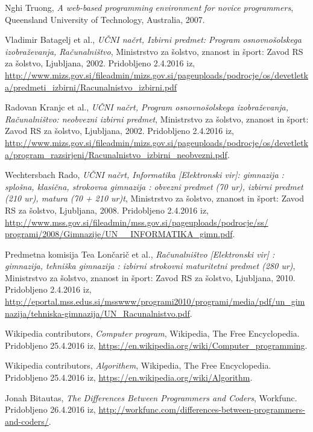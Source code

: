 \begin{thebibliography}{9}
  Nghi Truong,
  \emph{A web-based programming environment for novice programmers},
  Queensland University of Technology, Australia, 2007.

 Vladimir Batagelj et al., \emph{UČNI
    načrt, Izbirni predmet: Program osnovnošolskega izobraževanja,
    Računalništvo}, Ministrstvo za šolstvo, znanost in šport: Zavod RS
  za šolstvo, Ljubljana, 2002. Pridobljeno 2.4.2016 iz,
  \url{http://www.mizs.gov.si/fileadmin/mizs.gov.si/pageuploads/podrocje/os/devetletka/predmeti_izbirni/Racunalnistvo_izbirni.pdf}


 Radovan Kranjc et al., \emph{UČNI
    načrt, Program osnovnošolskega izobraževanja, Računalništvo:
    neobvezni izbirni predmet}, Ministrstvo za šolstvo, znanost in
  šport: Zavod RS za šolstvo, Ljubljana, 2002. Pridobljeno 2.4.2016
  iz,
  \url{http://www.mizs.gov.si/fileadmin/mizs.gov.si/pageuploads/podrocje/os/devetletka/program_razsirjeni/Racunalnistvo_izbirni_neobvezni.pdf}.

 Wechtersbach Rado, \emph{UČNI
    načrt, Informatika [Elektronski vir]: gimnazija : splošna,
    klasična, strokovna gimnazija : obvezni predmet (70 ur), izbirni
    predmet (210 ur), matura (70 + 210 ur)t}, Ministrstvo za šolstvo,
  znanost in šport: Zavod RS za šolstvo, Ljubljana, 2008. Pridobljeno
  2.4.2016 iz,
  \url{http://www.mss.gov.si/fileadmin/mss.gov.si/pageuploads/podrocje/ss/ programi/2008/Gimnazije/UN__INFORMATIKA_gimn.pdf}.

 Predmetna komisija Tea Lončarič et al.,
  \emph{Računalništvo [Elektronski vir] : gimnazija, tehniška
    gimnazija : izbirni strokovni maturitetni predmet (280 ur)},
  Ministrstvo za šolstvo, znanost in šport: Zavod RS za šolstvo,
  Ljubljana, 2010. Pridobljeno 2.4.2016 iz,
  \url{http://eportal.mss.edus.si/msswww/programi2010/programi/media/pdf/un_gimnazija/tehniska-gimnazija/UN_Racunalnistvo.pdf}.

 Wikipedia contributors, \emph{Computer
    program}, Wikipedia, The Free Encyclopedia. Pridobljeno 25.4.2016
  iz,
  \url{https://en.wikipedia.org/wiki/Computer_programming}.


 Wikipedia contributors, \emph{Algorithem},
  Wikipedia, The Free Encyclopedia. Pridobljeno 25.4.2016 iz,
  \url{https://en.wikipedia.org/wiki/Algorithm}.

 Jonah Bitautas, \emph{The Differences Between
    Programmers and Coders}, Workfunc. Pridobljeno 26.4.2016 iz,
  \url{http://workfunc.com/differences-between-programmers-and-coders/}.


\end{thebibliography}
